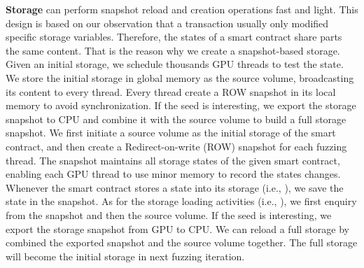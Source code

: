 \noindent\textbf{Storage}
{\tool} can perform snapshot reload and creation operations fast and light. This design is based on our observation that a transaction usually only modified specific storage variables. Therefore, the states of a smart contract share parts the same content. That is the reason why we create a snapshot-based storage. 
Given an initial storage, we schedule thousands GPU threads to test the state. We store the initial storage in global memory as the source volume, broadcasting its content to every thread. Every thread create a ROW snapshot in its local memory to avoid synchronization. If the seed is interesting, we export the storage snapshot to CPU and combine it with the source volume to build a full storage snapshot.   
%
We first initiate a source volume as the initial storage of the smart contract, and then create a Redirect-on-write (ROW) snapshot for each fuzzing thread. The snapshot maintains all storage states of the given smart contract, enabling each GPU thread to use minor memory to record the states changes. 
Whenever the smart contract stores a state into its storage (i.e., ), we save the state in the snapshot. As for the storage loading activities (i.e., ), we first enquiry from the snapshot and then the source volume. 
If the seed is interesting, we export the storage snapshot from GPU to CPU. 
We can reload a full storage by combined the exported snapshot and the source volume together. The full storage will become the initial storage in next fuzzing iteration.
